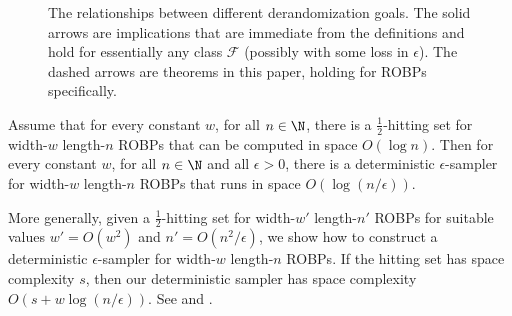 \documentclass{toc}
\DeclareMathOperator*{\ExpVal}{\mathbb{E}}
\begin{document}
\begin{figure}[h]
\begin{center}

\end{center}

\caption{The relationships between different derandomization goals. The solid arrows are implications that are immediate from the definitions and hold for essentially any class $\mathcal{F}$ (possibly with some loss in $\epsilon$). The dashed arrows are theorems in this paper, holding for ROBPs specifically.} \label{fig:implications}
\end{figure}

\begin{theorem} \label{thm:const-width-main}
Assume that for every constant $w$, for all $n \in \N$, there is a $\frac{1}{2}$-hitting set for width-$w$ length-$n$ ROBPs that can be computed in space $O(\log n)$. Then for every constant $w$, for all $n \in \N$ and all $\epsilon > 0$, there is a deterministic $\epsilon$-sampler for width-$w$ length-$n$ ROBPs that runs in space $O(\log(n/\epsilon))$.
\end{theorem}

More generally, given a $\frac{1}{2}$-hitting set for width-$w'$ length-$n'$ ROBPs for suitable values $w' = O(w^2)$ and $n' = O(n^2/\epsilon)$, we show how to construct a deterministic $\epsilon$-sampler for width-$w$ length-$n$ ROBPs. If the hitting set has space complexity $s$, then our deterministic sampler has space complexity $O(s + w \log(n/\epsilon))$. See  and .
\end{document}
